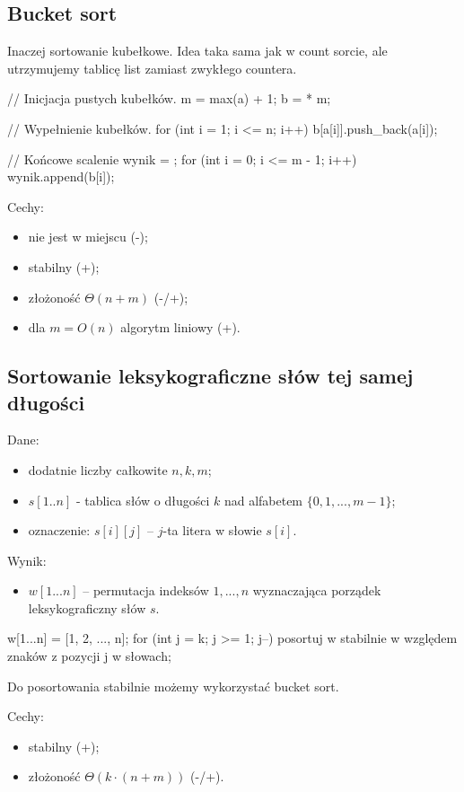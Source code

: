\subsection{Bucket sort}
Inaczej sortowanie kubełkowe. Idea taka sama jak w count sorcie, ale utrzymujemy tablicę list zamiast zwykłego countera.
\begin{cpp}
    // Inicjacja pustych kubełków.
    m = max(a) + 1;
    b = {} * m;
    
    // Wypełnienie kubełków.
    for (int i = 1; i <= n; i++)
        b[a[i]].push_back(a[i]);

    // Końcowe scalenie
    wynik = {};
    for (int i = 0; i <= m - 1; i++)
        wynik.append(b[i]);
\end{cpp}
Cechy:
\begin{itemize}
    \item nie jest w miejscu (-);
    \item stabilny (+);
    \item złożoność $\Theta(n + m)$ (-/+);
    \item dla $m = O(n)$ algorytm liniowy (+).
\end{itemize}

\subsection{Sortowanie leksykograficzne słów tej samej długości}
Dane:
\begin{itemize}
    \item dodatnie liczby całkowite $n, k, m$;
    \item $s[1..n]$ - tablica słów o długości $k$ nad alfabetem $\{0, 1, ..., m - 1\}$;
    \item oznaczenie: $s[i][j]$ – $j$-ta litera w słowie $s[i]$. 
\end{itemize}
Wynik:
\begin{itemize}
    \item $w[1...n]$ – permutacja indeksów $1, ..., n$ wyznaczająca porządek leksykograficzny słów $s$.
\end{itemize}
\begin{cpp}
    w[1...n] = [1, 2, ..., n];
    for (int j = k; j >= 1; j--) {
        posortuj w stabilnie w względem znaków z pozycji j w słowach;
    }
\end{cpp}
Do posortowania stabilnie możemy wykorzystać bucket sort.

Cechy:
\begin{itemize}
    \item stabilny (+);
    \item złożoność $\Theta(k \cdot (n + m))$ (-/+).
\end{itemize}

